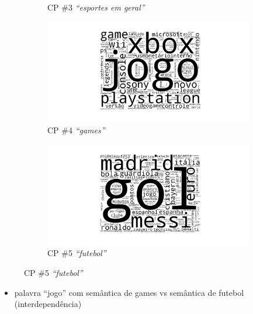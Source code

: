 \documentclass[10pt]{beamer}
\begin{document}
\begin{frame} [shrink=15]
\begin{figure}[H]
\begin{subfigure}[b]{0.45\textwidth}
          \caption{CP \#3 \textit{``esportes em geral''}}
      \end{subfigure}
      \begin{subfigure}[b]{0.45\textwidth}
          \includegraphics[width=\textwidth]{img/onmtf-tc-4.png}
          \caption{CP \#4 \textit{``games''}}
      \end{subfigure}
      \begin{subfigure}[b]{0.45\textwidth}
          \includegraphics[width=\textwidth]{img/onmtf-tc-5.png}
          \caption{CP \#5 \textit{``futebol''}}
      \end{subfigure}
  \end{figure}

  \begin{itemize}
      \item palavra ``jogo'' com semântica de games vs semântica de futebol (interdependência)
    \end{itemize}

\end{frame}

\end{document}
